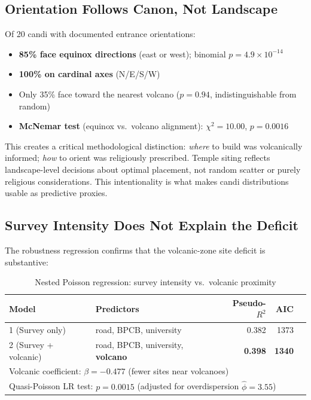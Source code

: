 \documentclass[12pt,a4paper]{article}
\begin{document}
\subsection{Orientation Follows Canon, Not Landscape}

Of 20 candi with documented entrance orientations:
\begin{itemize}
    \item \textbf{85\% face equinox directions} (east or west); binomial $p=4.9\times10^{-14}$
    \item \textbf{100\% on cardinal axes} (N/E/S/W)
    \item Only 35\% face toward the nearest volcano ($p=0.94$, indistinguishable from random)
    \item \textbf{McNemar test} (equinox vs.\ volcano alignment): $\chi^2=10.00$, $p=0.0016$
\end{itemize}

This creates a critical methodological distinction: \emph{where} to build was volcanically informed; \emph{how} to orient was religiously prescribed. Temple siting reflects landscape-level decisions about optimal placement, not random scatter or purely religious considerations. This intentionality is what makes candi distributions usable as predictive proxies.

\subsection{Survey Intensity Does Not Explain the Deficit}
\label{sec:adv3results}

The robustness regression confirms that the volcanic-zone site deficit is substantive:

\begin{table}[h]
\centering
\caption{Nested Poisson regression: survey intensity vs.\ volcanic proximity}
\begin{tabular}{llrrr}
\toprule
Model & Predictors & Pseudo-$R^2$ & AIC & \\
\midrule
1 (Survey only) & road, BPCB, university & 0.382 & 1373 & \\
2 (Survey + volcanic) & road, BPCB, university, \textbf{volcano} & \textbf{0.398} & \textbf{1340} & \\
\midrule
\multicolumn{4}{l}{Volcanic coefficient: $\beta=-0.477$ (fewer sites near volcanoes)} \\
\multicolumn{4}{l}{Quasi-Poisson LR test: $p=0.0015$ (adjusted for overdispersion $\hat{\phi}=3.55$)} \\
\bottomrule
\end{tabular}
\label{tab:adv3}
\end{table}
\end{document}
